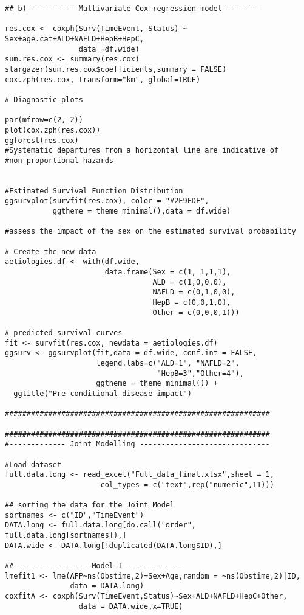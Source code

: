 \documentclass[11pt,twoside]{article}
\numberwithin{Theorem}{section}
\numberwithin{Definition}{section}
\numberwithin{Lemma}{section}
\numberwithin{Algorithm}{section}
\numberwithin{equation}{section}
\begin{document}
\begin{lstlisting}
## b) ---------- Multivariate Cox regression model --------

res.cox <- coxph(Surv(TimeEvent, Status) ~ Sex+age.cat+ALD+NAFLD+HepB+HepC,
                 data =df.wide)
sum.res.cox <- summary(res.cox)
stargazer(sum.res.cox$coefficients,summary = FALSE)
cox.zph(res.cox, transform="km", global=TRUE)

# Diagnostic plots

par(mfrow=c(2, 2))
plot(cox.zph(res.cox))
ggforest(res.cox)
#Systematic departures from a horizontal line are indicative of
#non-proportional hazards


#Estimated Survival Function Distribution
ggsurvplot(survfit(res.cox), color = "#2E9FDF",
           ggtheme = theme_minimal(),data = df.wide)

#assess the impact of the sex on the estimated survival probability

# Create the new data
aetiologies.df <- with(df.wide,
                       data.frame(Sex = c(1, 1,1,1),
                                  ALD = c(1,0,0,0),
                                  NAFLD = c(0,1,0,0),
                                  HepB = c(0,0,1,0),
                                  Other = c(0,0,0,1)))

# predicted survival curves
fit <- survfit(res.cox, newdata = aetiologies.df)
ggsurv <- ggsurvplot(fit,data = df.wide, conf.int = FALSE,
                     legend.labs=c("ALD=1", "NAFLD=2",
                                   "HepB=3","Other=4"),
                     ggtheme = theme_minimal()) +
  ggtitle("Pre-conditional disease impact")

#############################################################

#############################################################
#------------- Joint Modelling ------------------------------

#Load dataset
full.data.long <- read_excel("Full_data_final.xlsx",sheet = 1,
                      col_types = c("text",rep("numeric",11)))

## sorting the data for the Joint Model
sortnames <- c("ID","TimeEvent")
DATA.long <- full.data.long[do.call("order", full.data.long[sortnames]),]
DATA.wide <- DATA.long[!duplicated(DATA.long$ID),]

##------------------Model I -------------
lmefit1 <- lme(AFP~ns(Obstime,2)+Sex+Age,random = ~ns(Obstime,2)|ID,
               data = DATA.long)
coxfitA <- coxph(Surv(TimeEvent,Status)~Sex+ALD+NAFLD+HepC+Other,
                 data = DATA.wide,x=TRUE)


\end{lstlisting}
\end{document}
